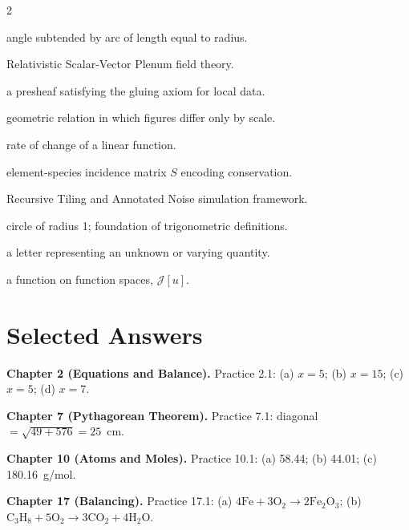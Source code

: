 \documentclass[11pt, openany]{book}
\theoremstyle{plain}
\theoremstyle{definition}
\theoremstyle{remark}
\begin{document}
\begin{multicols}{2}
\begin{description}[labelindent=0pt,leftmargin=0.8em,style=nextline]
\item[Radian] angle subtended by arc of length equal to radius.

\item[RSVP] Relativistic Scalar-Vector Plenum field theory.

\item[Sheaf] a presheaf satisfying the gluing axiom for local data.

\item[Similarity] geometric relation in which figures differ only by scale.

\item[Slope] rate of change of a linear function.

\item[Stoichiometric matrix] element-species incidence matrix $S$ encoding conservation.

\item[TARTAN] Recursive Tiling and Annotated Noise simulation framework.

\item[Unit circle] circle of radius 1; foundation of trigonometric definitions.

\item[Variable] a letter representing an unknown or varying quantity.

\item[Variational functional] a function on function spaces, $\mathcal{J}[u]$.

\end{description}
\end{multicols}


\chapter*{Selected Answers}

\textbf{Chapter 2 (Equations and Balance).}
Practice 2.1: (a) $x=5$; (b) $x=15$; (c) $x=5$; (d) $x=7$.

\textbf{Chapter 7 (Pythagorean Theorem).}
Practice 7.1: diagonal $=\sqrt{49+576}=25$~cm.

\textbf{Chapter 10 (Atoms and Moles).}
Practice 10.1: (a) 58.44; (b) 44.01; (c) 180.16~g/mol.

\textbf{Chapter 17 (Balancing).}
Practice 17.1: (a) $4\mathrm{Fe}+3\mathrm{O_2}\to2\mathrm{Fe_2O_3}$;
(b) $\mathrm{C_3H_8}+5\mathrm{O_2}\to3\mathrm{CO_2}+4\mathrm{H_2O}$.
\end{document}
